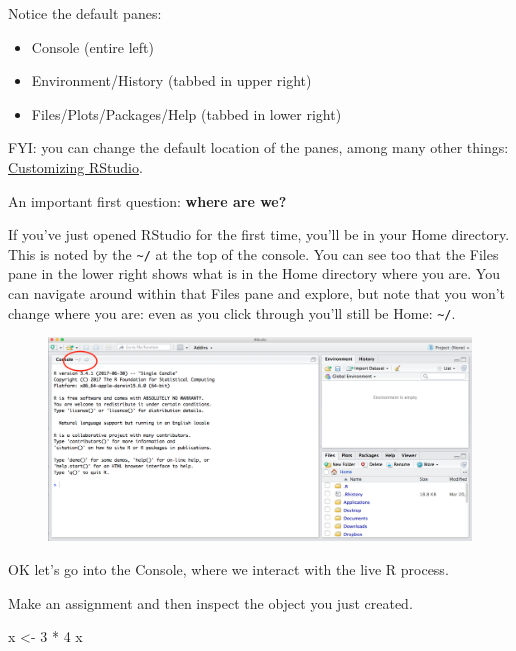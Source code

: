 \documentclass[]{book}
\newenvironment{Shaded}{\begin{snugshade}}{\end{snugshade}}
\newcommand{\DecValTok}[1]{\textcolor[rgb]{0.00,0.00,0.81}{{#1}}}
\newcommand{\StringTok}[1]{\textcolor[rgb]{0.31,0.60,0.02}{{#1}}}
\newcommand{\NormalTok}[1]{{#1}}
\providecommand{\tightlist}{%
  \setlength{\itemsep}{0pt}\setlength{\parskip}{0pt}}
\theoremstyle{definition}
\theoremstyle{definition}
\theoremstyle{definition}
\theoremstyle{remark}
\begin{document}
Notice the default panes:

\begin{itemize}
\tightlist
\item
  Console (entire left)
\item
  Environment/History (tabbed in upper right)
\item
  Files/Plots/Packages/Help (tabbed in lower right)
\end{itemize}

FYI: you can change the default location of the panes, among many other
things:
\href{https://support.rstudio.com/hc/en-us/articles/200549016-Customizing-RStudio}{Customizing
RStudio}.

An important first question: \textbf{where are we?}

If you've just opened RStudio for the first time, you'll be in your Home
directory. This is noted by the \texttt{\textasciitilde{}/} at the top
of the console. You can see too that the Files pane in the lower right
shows what is in the Home directory where you are. You can navigate
around within that Files pane and explore, but note that you won't
change where you are: even as you click through you'll still be Home:
\texttt{\textasciitilde{}/}.

\begin{figure}[htbp]
\centering
\includegraphics{img/RStudio_IDE_homedir.png}
\caption{}
\end{figure}

OK let's go into the Console, where we interact with the live R process.

Make an assignment and then inspect the object you just created.

\begin{Shaded}
\begin{Highlighting}[]
\NormalTok{x <-}\StringTok{ }\DecValTok{3} \NormalTok{*}\StringTok{ }\DecValTok{4}
\NormalTok{x}
\end{Highlighting}
\end{Shaded}
\end{document}
